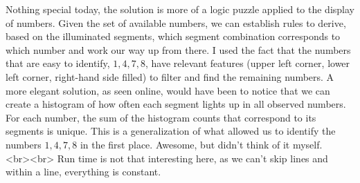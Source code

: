 Nothing special today, the solution is more of a logic puzzle applied to the display of numbers. Given the set of available numbers, we can establish rules to derive, based on the illuminated segments, which segment combination corresponds to which number and work our way up from there. I used the fact that the numbers that are easy to identify, $1,4,7,8$, have relevant features (upper left corner, lower left corner, right-hand side filled) to filter and find the remaining numbers. A more elegant solution, as seen online, would have been to notice that we can create a histogram of how often each segment lights up in all observed numbers. For each number, the sum of the histogram counts that correspond to its segments is unique. This is a generalization of what allowed us to identify the numbers $1,4,7,8$ in the first place. Awesome, but didn't think of it myself. 🎅
<br><br>
Run time is not that interesting here, as we can't skip lines and within a line, everything is constant.
